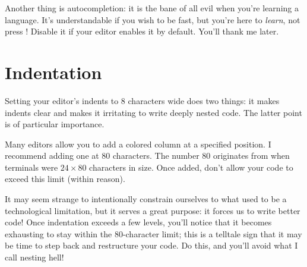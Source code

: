 Another thing is autocompletion: it is the bane of all evil when you're
learning a language.  It's understandable if you wish to be fast, but
you're here to \emph{learn}, not press !  Disable it if your
editor enables it by default.  You'll thank me later.

\section{Indentation}

Setting your editor's indents to 8 characters wide does two things: it
makes indents clear and makes it irritating to write deeply nested code.
The latter point is of particular importance.

Many editors allow you to add a colored column at a specified position.
I recommend adding one at 80 characters.  The number 80 originates from
when terminals were \(24 \times 80\) characters in size.  Once added,
don't allow your code to exceed this limit (within reason).

It may seem strange to intentionally constrain ourselves to what used to
be a technological limitation, but it serves a great purpose: it forces
us to write better code!  Once indentation exceeds a few levels, you'll
notice that it becomes exhausting to stay within the 80-character limit;
this is a telltale sign that it may be time to step back and restructure
your code.  Do this, and you'll avoid what I call nesting hell!
